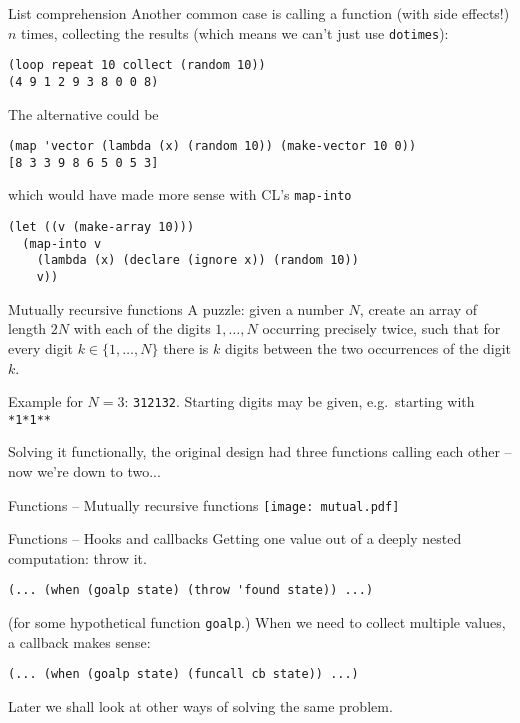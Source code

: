 \documentclass[presentation]{beamer}
\begin{document}
\begin{frame}[fragile]{List comprehension}
  Another common case is calling a function (with side effects!) $n$ times, collecting the results (which means we can't just use \texttt{dotimes}):
\begin{verbatim}
(loop repeat 10 collect (random 10))
(4 9 1 2 9 3 8 0 0 8)
\end{verbatim}
The alternative could be
\begin{verbatim}
(map 'vector (lambda (x) (random 10)) (make-vector 10 0))
[8 3 3 9 8 6 5 0 5 3]
\end{verbatim}
which would have made more sense with CL's \texttt{map-into}
\begin{verbatim}
(let ((v (make-array 10)))
  (map-into v
    (lambda (x) (declare (ignore x)) (random 10))
    v))
\end{verbatim}
\end{frame}

\begin{frame}{Mutually recursive functions}
  A puzzle: given a number $N$, create an array of length $2N$ with each of the digits $1,\ldots,N$ occurring precisely twice, such that for every digit $k\in\{1,\ldots,N\}$ there is $k$ digits between the two occurrences of the digit $k$.

  \medskip
  Example for $N=3$: \texttt{312132}.  Starting digits may be given, e.g.\ starting with \texttt{*1*1**}

  \medskip
  Solving it functionally, the original design had three functions calling each other -- now we're down to two...
\end{frame}


\begin{frame}{Functions -- Mutually recursive functions}
  \resizebox{!}{8cm}
            {
              \texttt{[image: mutual.pdf]}
            }
\end{frame}

\begin{frame}[fragile]{Functions -- Hooks and callbacks}
Getting one value out of a deeply nested computation: throw it.
\begin{verbatim}
(... (when (goalp state) (throw 'found state)) ...)
\end{verbatim}
(for some hypothetical function \texttt{goalp}.)  When we need to collect multiple values, a callback makes sense:
\begin{verbatim}
(... (when (goalp state) (funcall cb state)) ...)
\end{verbatim}
Later we shall look at other ways of solving the same problem.
\end{frame}
\end{document}
